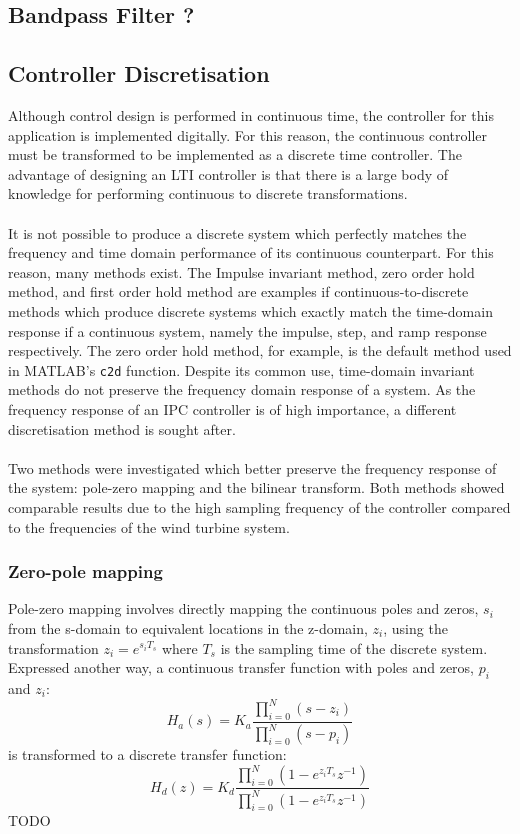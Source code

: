 \subsection{Bandpass Filter ?}

\subsection{Controller Discretisation}
Although control design is performed in continuous time, the controller for this application is implemented digitally. For this reason, the continuous controller must be transformed to be implemented as a discrete time controller. The advantage of designing an LTI controller is that there is a large body of knowledge for performing continuous to discrete transformations. 
\\~\\
It is not possible to produce a discrete system which perfectly matches the frequency and time domain performance of its continuous counterpart. For this reason, many methods exist. The Impulse invariant method, zero order hold method, and first order hold method are examples if continuous-to-discrete methods which produce discrete systems which exactly match the time-domain response if a continuous system, namely the impulse, step, and ramp response respectively. The zero order hold method, for example, is the default method used in MATLAB's \texttt{c2d} function. Despite its common use, time-domain invariant methods do not preserve the frequency domain response of a system. As the frequency response of an IPC controller is of high importance, a different discretisation method is sought after.
\\~\\
Two methods were investigated which better preserve the frequency response of the system: pole-zero mapping and the bilinear transform. Both methods showed comparable results due to the high sampling frequency of the controller compared to the frequencies of the wind turbine system.
\subsubsection{Zero-pole mapping}
Pole-zero mapping involves directly mapping the continuous poles and zeros, $s_i$ from the s-domain to equivalent locations in the z-domain, $z_i$, using the transformation $z_i = e^{s_iT_s}$ where $T_s$ is the sampling time of the discrete system. Expressed another way, a continuous transfer function with poles and zeros, $p_i$ and $z_i$:
$$H_a(s) = K_a\frac{\prod_{i=0}^{N}(s-z_i)}{\prod_{i=0}^{N}(s-p_i)}$$
is transformed to a discrete transfer function:
$$H_d(z) = K_d\frac{\prod_{i=0}^{N}(1-e^{z_iT_s}z^{-1})}{\prod_{i=0}^{N}(1-e^{z_iT_s}z^{-1})}$$
TODO
